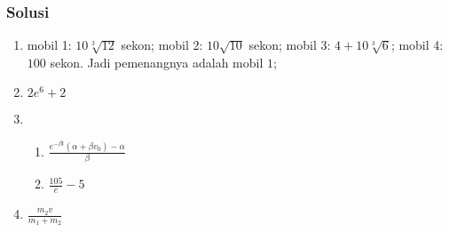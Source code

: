 \documentclass[10pt,aspectratio=54]{beamer}
\begin{document}
\begin{frame}
\frametitle{Solusi}
\begin{enumerate}
 \item mobil 1: $10\sqrt[3]{12}$ sekon; mobil 2: $10\sqrt{10}$ sekon; mobil 3: $4 + 10\sqrt[3]{6}$; mobil 4: $100$ sekon. Jadi pemenangnya adalah $\boxed{\text{mobil 1}}$;
 
 \item $2e^6 + 2$
 \item \begin{enumerate}
   \item $ \frac{e^{-\beta t}(\alpha + \beta v_0) - \alpha}{\beta}$
   \item $\frac{105}{e}-5$
 \end{enumerate}
 \item $\frac{m_2v}{m_1+m_2}$
 
\end{enumerate}
\end{frame}
\end{document}

